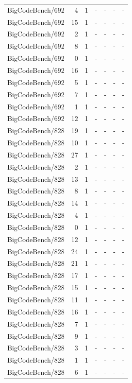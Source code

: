 \begin{longtable}{lrrllll}
BigCodeBench/692 & 4 & 1 & - & - & - & - \\
BigCodeBench/692 & 15 & 1 & - & - & - & - \\
BigCodeBench/692 & 2 & 1 & - & - & - & - \\
BigCodeBench/692 & 8 & 1 & - & - & - & - \\
BigCodeBench/692 & 0 & 1 & - & - & - & - \\
BigCodeBench/692 & 16 & 1 & - & - & - & - \\
BigCodeBench/692 & 5 & 1 & - & - & - & - \\
BigCodeBench/692 & 7 & 1 & - & - & - & - \\
BigCodeBench/692 & 1 & 1 & - & - & - & - \\
BigCodeBench/692 & 12 & 1 & - & - & - & - \\
BigCodeBench/828 & 19 & 1 & - & - & - & - \\
BigCodeBench/828 & 10 & 1 & - & - & - & - \\
BigCodeBench/828 & 27 & 1 & - & - & - & - \\
BigCodeBench/828 & 2 & 1 & - & - & - & - \\
BigCodeBench/828 & 13 & 1 & - & - & - & - \\
BigCodeBench/828 & 8 & 1 & - & - & - & - \\
BigCodeBench/828 & 14 & 1 & - & - & - & - \\
BigCodeBench/828 & 4 & 1 & - & - & - & - \\
BigCodeBench/828 & 0 & 1 & - & - & - & - \\
BigCodeBench/828 & 12 & 1 & - & - & - & - \\
BigCodeBench/828 & 24 & 1 & - & - & - & - \\
BigCodeBench/828 & 21 & 1 & - & - & - & - \\
BigCodeBench/828 & 17 & 1 & - & - & - & - \\
BigCodeBench/828 & 15 & 1 & - & - & - & - \\
BigCodeBench/828 & 11 & 1 & - & - & - & - \\
BigCodeBench/828 & 16 & 1 & - & - & - & - \\
BigCodeBench/828 & 7 & 1 & - & - & - & - \\
BigCodeBench/828 & 9 & 1 & - & - & - & - \\
BigCodeBench/828 & 3 & 1 & - & - & - & - \\
BigCodeBench/828 & 1 & 1 & - & - & - & - \\
BigCodeBench/828 & 6 & 1 & - & - & - & - \\

\end{longtable}
